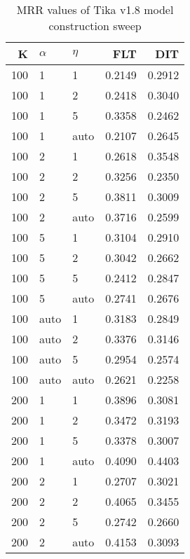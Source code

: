 
\begin{table}
\begin{spacing}{1.2}
\centering
\caption{MRR values of Tika v1.8 model construction sweep}
\label{table:tika_model_sweep}
\vspace{0.2em}
\parbox{.45\linewidth}{\centering \begin{tabular}{rll|rr}
\toprule
   K & $\alpha$ &   $\eta$ & FLT & DIT \\
\midrule
 100 &     1 &     1 &           0.2149 & 0.2912 \\
 100 &     1 &     2 &           0.2418 & 0.3040 \\
 100 &     1 &     5 &           0.3358 & 0.2462 \\
 100 &     1 &  auto &           0.2107 & 0.2645 \\
 100 &     2 &     1 &           0.2618 & 0.3548 \\
 100 &     2 &     2 &           0.3256 & 0.2350 \\
 100 &     2 &     5 &           0.3811 & 0.3009 \\
 100 &     2 &  auto &           0.3716 & 0.2599 \\
 100 &     5 &     1 &           0.3104 & 0.2910 \\
 100 &     5 &     2 &           0.3042 & 0.2662 \\
 100 &     5 &     5 &           0.2412 & 0.2847 \\
 100 &     5 &  auto &           0.2741 & 0.2676 \\
 100 &  auto &     1 &           0.3183 & 0.2849 \\
 100 &  auto &     2 &           0.3376 & 0.3146 \\
 100 &  auto &     5 &           0.2954 & 0.2574 \\
 100 &  auto &  auto &           0.2621 & 0.2258 \\
 200 &     1 &     1 &           0.3896 & 0.3081 \\
 200 &     1 &     2 &           0.3472 & 0.3193 \\
 200 &     1 &     5 &           0.3378 & 0.3007 \\
 200 &     1 &  auto &           0.4090 & 0.4403 \\
 200 &     2 &     1 &           0.2707 & 0.3021 \\
 200 &     2 &     2 &           0.4065 & 0.3455 \\
 200 &     2 &     5 &           0.2742 & 0.2660 \\
 200 &     2 &  auto &           0.4153 & 0.3093 \\

\end{tabular}}
\end{spacing}
\end{table}
